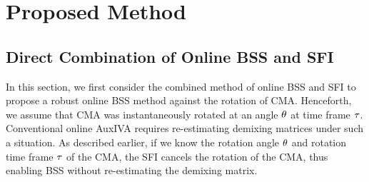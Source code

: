 \documentclass[sip,biber]{now-journal}
\begin{document}
\section{Proposed Method}\label{sec:proposed}

\subsection{Direct Combination of Online BSS and SFI}

In this section, we first consider the combined method of online BSS and SFI \cite{Wakabayashi:2023:ASLP} to propose a robust online BSS method against the rotation of CMA.
Henceforth, we assume that CMA was instantaneously rotated at an angle $\theta$ at time frame $\tau$.
Conventional online AuxIVA requires re-estimating demixing matrices under such a situation.
As described earlier, if we know the rotation angle $\theta$ and rotation time frame $\tau$ of the CMA, the SFI cancels the rotation of the CMA, thus enabling BSS without re-estimating the demixing matrix.
\end{document}
